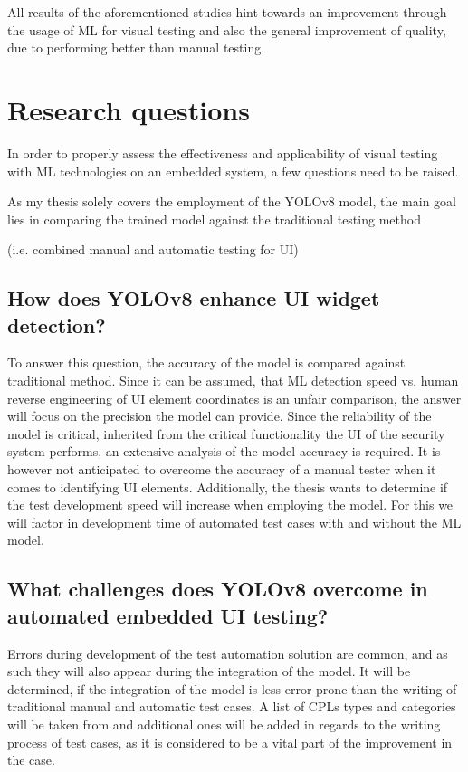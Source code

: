 \documentclass[Proposal,BIC,english,IEEE]{BASE/twbook} %
\begin{document}
All results of the aforementioned studies hint towards an improvement through the usage of ML for visual testing and also the general improvement of quality, due to performing better than manual testing.

\newpage
\chapter{Research questions}
In order to properly assess the effectiveness and applicability of visual testing with ML technologies on an embedded system, a few questions need to be raised.

As my thesis solely covers the employment of the YOLOv8 model, the main goal lies in comparing the trained model against the traditional testing method \begin{em}(i.e. combined manual and automatic testing for UI)\end{em}
\section{How does YOLOv8 enhance UI widget detection?}
To answer this question, the accuracy of the model is compared against traditional method. Since it can be assumed, that ML detection speed vs. human reverse engineering of UI element coordinates is an unfair comparison, the answer will focus on the precision the model can provide.
Since the reliability of the model is critical, inherited from the critical functionality the UI of the security system performs, an extensive analysis of the model accuracy is required.
It is however not anticipated to overcome the accuracy of a manual tester when it comes to identifying UI elements.
Additionally, the thesis wants to determine if the test development speed will increase when employing the model. For this we will factor in development time of automated test cases with and without the ML model.

\section{What challenges does YOLOv8 overcome in automated embedded UI testing?}
Errors during development of the test automation solution are common, and as such they will also appear during the integration of the model.
It will be determined, if the integration of the model is less error-prone than the writing of traditional manual and automatic test cases.
A list of CPLs types and categories will be taken from \autocite{alegrothVisualGUITesting2015} and additional ones will be added in regards to the writing process of test cases, as it is considered to be a vital part of the improvement in the case.
\end{document}
